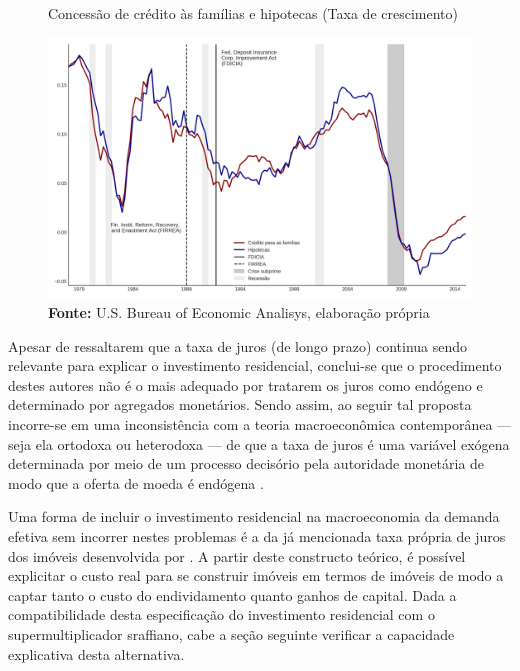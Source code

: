 \begin{figure}[htb]
	\centering
	\caption{Concessão de crédito às famílias e hipotecas (Taxa de crescimento)}
	\label{FigCreditoFDICIA}
	\includegraphics[width=\textwidth]{../../Dados/Fatos_Estilizados/figs/FDICIA.png}
	\caption*{\textbf{Fonte:} U.S. Bureau of Economic Analisys, elaboração própria}
\end{figure}
	
Apesar de \textcite{gauger_residential_2003} ressaltarem que a taxa de juros (de longo prazo) continua sendo relevante para explicar o investimento residencial, conclui-se que o procedimento destes autores não é o mais adequado por tratarem os juros como endógeno e determinado por agregados monetários. Sendo assim, ao seguir tal proposta incorre-se em uma inconsistência com a teoria macroeconômica contemporânea --- seja ela ortodoxa ou heterodoxa --- de que a taxa de juros é uma variável exógena determinada por meio de um processo decisório pela autoridade monetária de modo que a oferta de moeda é endógena \cite[p.~230--256]{lavoie_post-keynesian_2015}.

Uma forma de incluir o investimento residencial na macroeconomia da demanda efetiva sem incorrer nestes problemas é a da já mencionada taxa própria de juros dos imóveis desenvolvida por \textcite{teixeira_crescimento_2015}. A partir deste constructo teórico, é possível explicitar o custo real para se construir imóveis em termos de imóveis de modo a captar tanto o custo do endividamento quanto ganhos de capital.
Dada a compatibilidade desta especificação do investimento residencial com o supermultiplicador sraffiano, cabe a seção seguinte verificar a capacidade explicativa desta alternativa.

